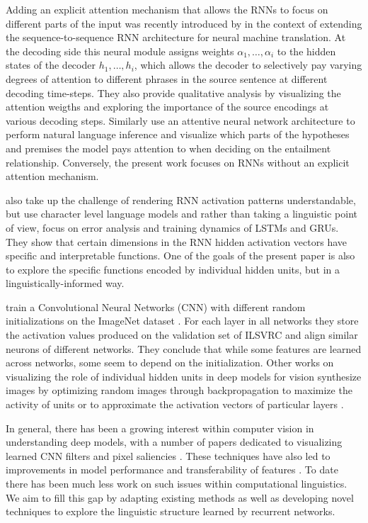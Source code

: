 Adding an explicit attention mechanism that allows the RNNs to focus on \label{edit:attention}
different parts of the input was recently introduced by 
in the context of extending the sequence-to-sequence 
RNN architecture for neural machine translation. 
At the decoding side this neural module assigns weights 
$\alpha_{1},\ldots,\alpha_{i}$ to the hidden states of the decoder 
$h_{1},\ldots,h_{i}$, which allows the decoder to selectively pay varying degrees of
attention to different phrases in the source sentence at different decoding time-steps.
They also provide qualitative analysis by visualizing the attention
weigths and exploring the importance of the source encodings at various decoding steps.
Similarly  use an attentive neural 
network architecture to perform natural language inference and visualize which parts
of the hypotheses and premises the model pays attention to when deciding on the 
entailment relationship. Conversely, the present work focuses on RNNs without an 
explicit attention mechanism.

 also take up the challenge of
rendering RNN activation patterns understandable, but use character
level language models and rather than taking a linguistic point of
view, focus on error analysis and training dynamics of LSTMs and
GRUs.  They show that certain dimensions in the RNN hidden activation
vectors have specific and interpretable functions. One of the goals of
the present paper is also to explore the specific functions encoded
by individual hidden units, but in a linguistically-informed way.

 train a Convolutional Neural Networks (CNN)
with different random initializations
on the ImageNet dataset \cite{krizhevsky2012imagenet}. For each layer
in all networks they store the activation values produced on the
validation set of ILSVRC and align similar neurons of different
networks. They conclude that while some features are learned across
networks, some seem to depend on the initialization. Other works on
visualizing the role of individual hidden units in deep models for vision
synthesize images by optimizing random images through backpropagation
to maximize the activity of units
\cite{erhan2009visualizing,simonyan2013deep,yosinski2015understanding,nguyen2016multifaceted}
or to approximate the activation vectors of particular layers
\cite{mahendran2015visualizing,dosovitskiy2015inverting}.

In general, there has been a growing interest within computer vision
in understanding deep models, with a number of papers dedicated to
visualizing learned CNN filters and pixel saliencies
\cite{simonyan2013deep,yosinski2015understanding,mahendran2015understanding}. These
techniques have also led to improvements in model performance
\cite{eigen2013understanding} and transferability of features
\cite{zhou2014object}. To date there has been much less work on such
issues within computational linguistics. We aim to fill this gap by
adapting existing methods as well as developing novel techniques to
explore the linguistic structure learned by recurrent networks.
